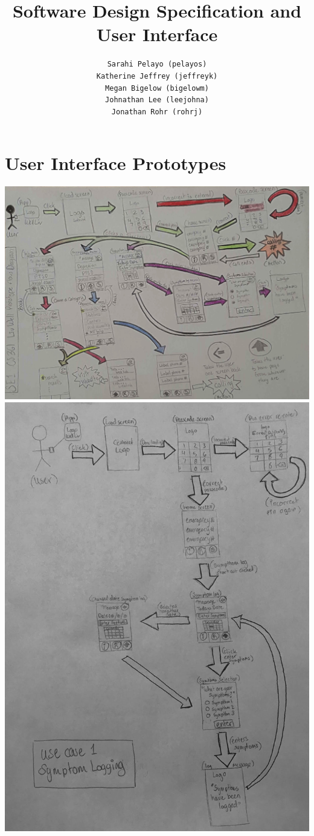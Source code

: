 \documentclass[letterpaper,12pt,titlepage]{article}
\title{Software Design Specification and User Interface}
\author{
  \texttt{Sarahi Pelayo (pelayos)}
  \\[.5ex]
  \texttt{Katherine Jeffrey (jeffreyk)}
  \\[.5ex]
  \texttt{Megan Bigelow (bigelowm)}
  \\[.5ex]
  \texttt{Johnathan Lee (leejohna)}
  \\[.5ex]
  \texttt{Jonathan Rohr (rohrj)}
}
\begin{document}
\maketitle

\section{User Interface Prototypes}
\vspace{50pt}
\hspace*{-1in}
\includegraphics[scale=.25]
{prototype_4}
\newpage
\hspace*{-.2in}
\includegraphics[scale=.45]{prototype_1}
\end{document}
